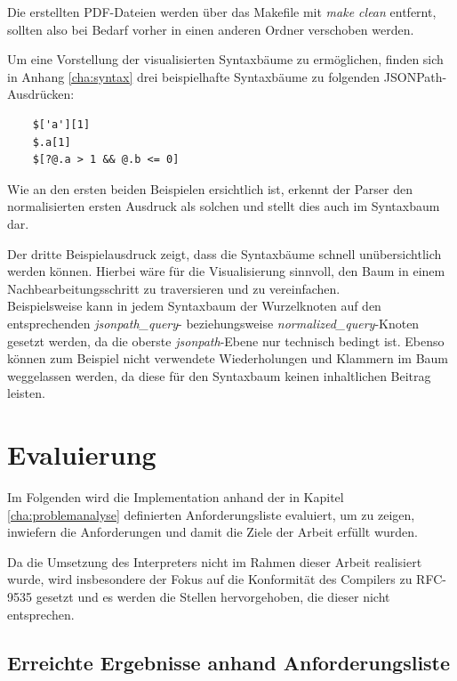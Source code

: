 \documentclass[oneside]{ausarbeitung}
\begin{document}
Die erstellten PDF-Dateien werden über das Makefile mit \textit{make clean} entfernt, sollten also bei Bedarf vorher in einen anderen Ordner verschoben werden.

Um eine Vorstellung der visualisierten Syntaxbäume zu ermöglichen, finden sich in Anhang \ref{cha:syntax} drei beispielhafte Syntaxbäume zu folgenden JSONPath-Ausdrücken:

\begin{lstlisting}
	$['a'][1]
	$.a[1]
	$[?@.a > 1 && @.b <= 0]
\end{lstlisting}

Wie an den ersten beiden Beispielen ersichtlich ist, erkennt der Parser den normalisierten ersten Ausdruck als solchen und stellt dies auch im Syntaxbaum dar. 

Der dritte Beispielausdruck zeigt, dass die Syntaxbäume schnell unübersichtlich werden können. Hierbei wäre für die Visualisierung sinnvoll, den Baum in einem Nachbearbeitungsschritt zu traversieren und zu vereinfachen. \\
Beispielsweise kann in jedem Syntaxbaum der Wurzelknoten auf den entsprechenden \textit{jsonpath\_query}- beziehungsweise \textit{normalized\_query}-Knoten gesetzt werden, da die oberste \textit{jsonpath}-Ebene nur technisch bedingt ist. Ebenso können zum Beispiel nicht verwendete Wiederholungen und Klammern im Baum weggelassen werden, da diese für den Syntaxbaum keinen inhaltlichen Beitrag leisten.








\chapter{Evaluierung}

Im Folgenden wird die Implementation anhand der in Kapitel \ref{cha:problemanalyse} definierten Anforderungsliste evaluiert, um zu zeigen, inwiefern die Anforderungen und damit die Ziele der Arbeit erfüllt wurden.

Da die Umsetzung des Interpreters nicht im Rahmen dieser Arbeit realisiert wurde, wird insbesondere der Fokus auf die Konformität des Compilers zu RFC-9535 gesetzt und es werden die Stellen hervorgehoben, die dieser nicht entsprechen.

\section{Erreichte Ergebnisse anhand Anforderungsliste}
	\label{sect_erreichte_ergebnisse_anforderung}
	
\end{document}
